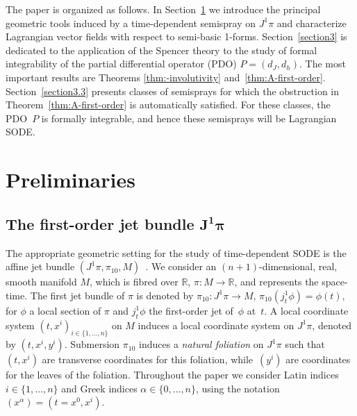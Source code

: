 \documentclass[pdftex]{sigma}
\begin{document}
The paper is organized as follows. In Section~\ref{sec:prelim} we introduce the principal
geometric tools induced by a time-dependent semispray on $J^{1}\pi$
and characterize Lagrangian vector f\/ields with respect to semi-basic
1-forms. Section~\ref{section3} is dedicated to the application of the
Spencer theory to the study of formal integrability of the partial dif\/ferential operator (PDO) $P=(d_{J},d_{h})$.
The most important results are Theorems \ref{thm:-involutivity} and~\ref{thm:A-first-order}. Section~\ref{section3.3} presents classes
of semisprays for which the obstruction in Theorem~\ref{thm:A-first-order}
is automatically satisf\/ied. For these classes, the PDO~$P$ is formally
integrable, and hence these semisprays will be Lagrangian SODE.


\section{Preliminaries} \label{sec:prelim}


\subsection[The first-order jet bundle $J^{1}\pi$]{The f\/irst-order jet bundle $\boldsymbol{J^{1}\pi}$} \label{subsec:fn}

The appropriate geometric setting for the study of time-dependent
SODE is the af\/f\/ine jet bundle $(J^{1}\pi,\pi_{10},M)$~\cite{saunders89}.
We consider an $(n+1)$-dimensional, real, smooth manifold $M$, which
is f\/ibred over $\mathbb{R}$, $\pi:M\rightarrow\mathbb{R}$, and represents
the space-time. The f\/irst jet bundle of $\pi$ is denoted by $\pi_{10}:J^{1}\pi\to M$,
$\pi_{10}(j_{t}^{1}\phi)=\phi(t),$ for $\phi$ a local section of
$\pi$ and $j_{t}^{1}\phi$ the f\/irst-order jet of~$\phi$ at~$t$.
A local coordinate system $(t,x^{i})_{i\in \{1,\dots,n\}}$ on $M$
induces a local coordinate system on $J^{1}\pi$, denoted by $(t,x^{i},y^{i})$.
Submersion $\pi_{10}$ induces a \emph{natural foliation} on $J^{1}\pi$
such that~$(t,x^{i})$ are transverse coordinates for this foliation,
while~$(y^{i})$ are coordinates for the leaves of the foliation.
Throughout the paper we consider Latin indices $i\in \{1,\dots,n\}$
and Greek indices $\alpha\in \{0,\dots,n\}$, using the notation~$\left(x^{\alpha}\right)=(t=x^{0},x^{i})$.
\end{document}
